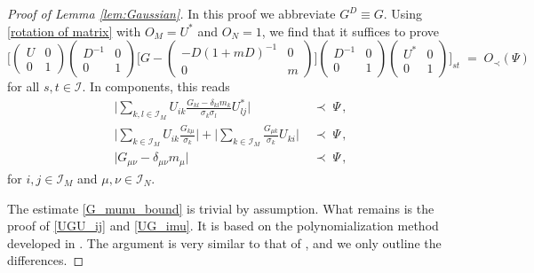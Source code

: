 \documentclass[11pt]{article} %
\numberwithin{equation}{section}
\numberwithin{figure}{section}
\theoremstyle{plain} %
\theoremstyle{definition} %
\renewcommand{\cal}{\mathcal}
\newcommand{\qBB}[1]{\Biggl[{#1}\Biggr]}
\newcommand{\absb}[1]{\bigl\lvert #1 \bigr\rvert}
\newcommand{\absBB}[1]{\Biggl\lvert #1 \Biggr\rvert}
\begin{document}
\begin{proof}[Proof of Lemma \ref{lem:Gaussian}]
In this proof we abbreviate $G^D \equiv G$. Using \eqref{rotation of matrix} with $O_M = U^*$ and $O_N = 1$, we find that it suffices to prove
\begin{equation*}
\qBB{
\begin{pmatrix}
U & 0
\\
0 & 1
\end{pmatrix}
\begin{pmatrix}
D^{-1} & 0
\\
0 & 1
\end{pmatrix}
\qBB{G -
\begin{pmatrix}
-D (1 + mD)^{-1} & 0
\\
0 & m
\end{pmatrix}
}
\begin{pmatrix}
D^{-1} & 0
\\
0 & 1
\end{pmatrix}
\begin{pmatrix}
U^* & 0
\\
0 & 1
\end{pmatrix}
}_{st} \;=\; O_\prec(\Psi)
\end{equation*}
for all $s,t \in \cal I$.
In components, this reads
\begin{align} \label{UGU_ij}
\absBB{\sum_{k,l \in \cal I_M} U_{ik} \frac{G_{kl} - \delta_{kl} m_k}{\sigma_k \sigma_l} U^*_{lj}} &\;\prec\; \Psi\,,
\\ \label{UG_imu}
\absBB{\sum_{k \in \cal I_M} U_{ik} \frac{G_{k \mu}}{\sigma_k}} + \absBB{\sum_{k \in \cal I_M} \frac{G_{\mu k}}{\sigma_k} U_{ki}} &\;\prec\; \Psi\,,
\\ \label{G_munu_bound}
\absb{G_{\mu \nu} - \delta_{\mu \nu} m_\mu} &\;\prec\; \Psi\,,
\end{align}
for $i,j \in \cal I_M$ and $\mu, \nu \in \cal I_N$.

The estimate \eqref{G_munu_bound} is trivial by assumption. What remains is the proof of \eqref{UGU_ij} and \eqref{UG_imu}. It is based on the polynomialization method developed in \cite[Section 5]{BEKYY}. The argument is very similar to that of \cite{BEKYY}, and we only outline the differences.


\end{proof}
\end{document}
